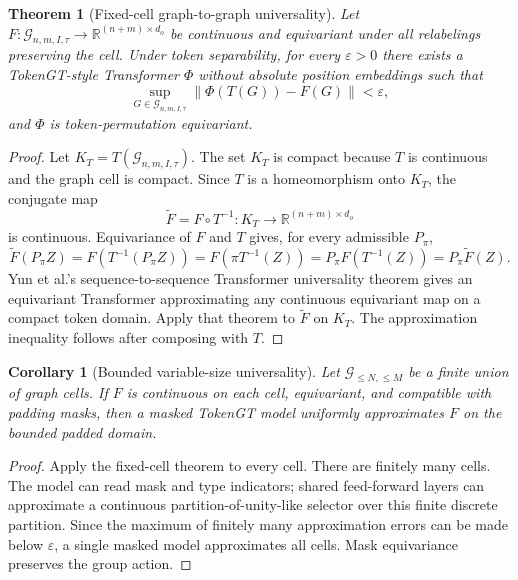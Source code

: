 \documentclass[11pt]{article}
\theoremstyle{definition}
\theoremstyle{plain}
\newtheorem{theorem}[definition]{Theorem}
\newtheorem{corollary}[definition]{Corollary}
\theoremstyle{remark}
\numberwithin{equation}{section}
\newcommand{\R}{\mathbb{R}}
\newcommand{\G}{\mathcal{G}}
\newcommand{\norm}[1]{\left\lVert #1\right\rVert}
\begin{document}
\begin{theorem}[Fixed-cell graph-to-graph universality]
Let $F:\G_{n,m,I,\tau}\to\R^{(n+m)\times d_o}$ be continuous and equivariant under all relabelings preserving the cell.  Under token separability, for every $\varepsilon>0$ there exists a TokenGT-style Transformer $\Phi$ without absolute position embeddings such that
\begin{equation}
  \sup_{G\in\G_{n,m,I,\tau}}\norm{\Phi(T(G))-F(G)}<\varepsilon,
\end{equation}
and $\Phi$ is token-permutation equivariant.
\end{theorem}

\begin{proof}
Let $K_T=T(\G_{n,m,I,\tau})$.  The set $K_T$ is compact because $T$ is continuous and the graph cell is compact.  Since $T$ is a homeomorphism onto $K_T$, the conjugate map
\begin{equation}
  \widetilde F=F\circ T^{-1}:K_T\to\R^{(n+m)\times d_o}
\end{equation}
is continuous.  Equivariance of $F$ and $T$ gives, for every admissible $P_\pi$,
\begin{equation}
  \widetilde F(P_\pi Z)=F(T^{-1}(P_\pi Z))=F(\pi T^{-1}(Z))=P_\pi F(T^{-1}(Z))=P_\pi\widetilde F(Z).
\end{equation}
Yun et al.'s sequence-to-sequence Transformer universality theorem gives an equivariant Transformer approximating any continuous equivariant map on a compact token domain.  Apply that theorem to $\widetilde F$ on $K_T$.  The approximation inequality follows after composing with $T$.
\end{proof}

\begin{corollary}[Bounded variable-size universality]
Let $\G_{\le N,\le M}$ be a finite union of graph cells.  If $F$ is continuous on each cell, equivariant, and compatible with padding masks, then a masked TokenGT model uniformly approximates $F$ on the bounded padded domain.
\end{corollary}

\begin{proof}
Apply the fixed-cell theorem to every cell.  There are finitely many cells.  The model can read mask and type indicators; shared feed-forward layers can approximate a continuous partition-of-unity-like selector over this finite discrete partition.  Since the maximum of finitely many approximation errors can be made below $\varepsilon$, a single masked model approximates all cells.  Mask equivariance preserves the group action.
\end{proof}
\end{document}
